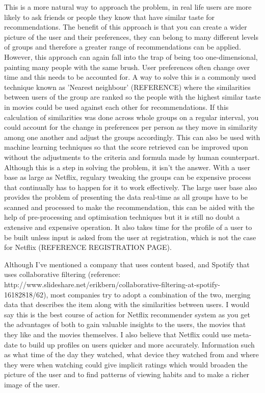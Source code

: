\documentclass[a4paper]{article}
\begin{document}
This is a more natural way to approach the problem, in real life users are more likely to ask friends or people they know that have similar taste for recommendations. The benefit of this approach is that you can create a wider picture of the user and their preferences, they can belong to many different levels of groups and therefore a greater range of recommendations can be applied. However, this approach can again fall into the trap of being too one-dimensional, painting many people with the same brush. User preferences often change over time and this needs to be accounted for. A way to solve this is a commonly used technique known as 'Nearest neighbour' (REFERENCE) where the similarities between users of the group are ranked so the people with the highest similar taste in movies could be used against each other for recommendations. If this calculation of similarities was done across whole groups on a regular interval, you could account for the change in preferences per person as they move in similarity among one another and adjust the groups accordingly. This can also be used with machine learning techniques so that the score retrieved can be improved upon without the adjustments to the criteria and formula made by human counterpart. Although this is a step in solving the problem, it isn't the answer. With a user base as large as Netflix, regulary tweaking the groups can be expensive process that continually has to happen for it to work effectively. The large user base also provides the problem of presenting the data real-time as all groups have to be scanned and processed to make the recommendation, this can be aided with the help of pre-processing and optimisation techniques but it is still no doubt a extensive and expensive operation. It also takes time for the profile of a user to be built unless input is asked from the user at registration, which is not the case for Netflix (REFERENCE REGISTRATION PAGE).

Although I've mentioned a company that uses content based, and Spotify that uses collaborative filtering (reference: http://www.slideshare.net/erikbern/collaborative-filtering-at-spotify-16182818/62), most companies try to adopt a combination of the two, merging data that describes the item along with the similarities between users. I would say this is the best course of action for Netflix recommender system as you get the advantages of both to gain valuable insights to the users, the movies that they like and the movies themselves. I also believe that Netflix could use meta-date to build up profiles on users quicker and more accurately. Information such as what time of the day they watched, what device they watched from and where they were when watching could give implicit ratings which would broaden the picture of the user and to find patterns of viewing habits and to make a richer image of the user.
\end{document}
